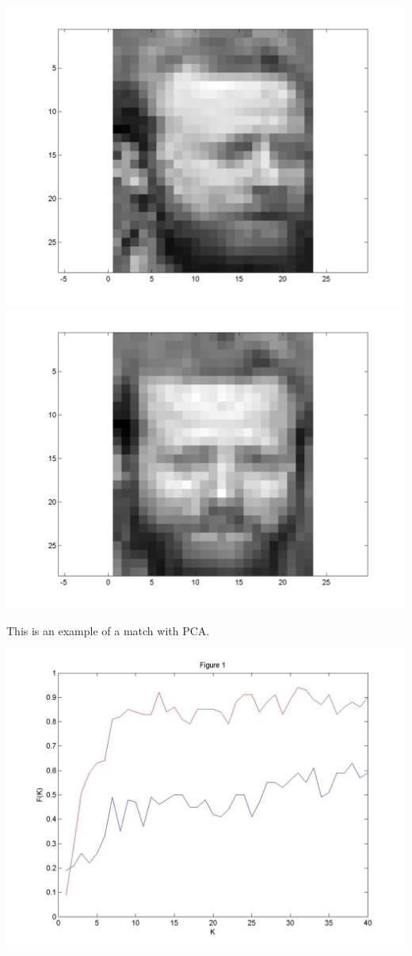 \documentclass[11pt]{article} %
\begin{document}
\includegraphics[scale=.17]{figure4}
\includegraphics[scale=.17]{figure5}

This is an example of a match with PCA.

\vspace{4mm}

\begin{center}
\includegraphics[scale=.3]{figure1}
\end{center}
\end{document}

